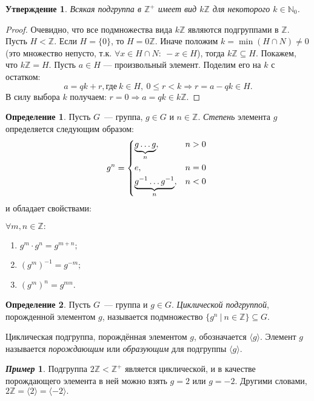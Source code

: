 \documentclass[a4paper, 14pt]{extarticle}
\newcommand{\n}{\par}
\newcommand{\integers}{\mathbb{Z}}
\newcommand{\naturals}{\mathbb{N}}
\theoremstyle{definition}
\newtheorem*{exmpl*}{\textit{Пример}}
\newtheorem{definition}{Определение}
\theoremstyle{plain}
\numberwithin{theorem}{section}
\numberwithin{definition}{section}
\newtheorem{statement}{Утверждение}
\numberwithin{statement}{section}
\numberwithin{lemma}{section}
\numberwithin{consequence}{section}
\begin{document}
	\begin{statement}
		Всякая подгруппа в $\integers ^ +$ имеет вид $k\integers$ для некоторого ${k \in \naturals_0}$.
	\end{statement}
	\begin{proof}
		Очевидно, что все подмножества вида $k\mathbb{Z}$ являются подгруппами в $\integers$.
		Пусть ${H < \integers}$. Если ${H = \{0\}}$, то ${H = 0\integers}$.
		Иначе положим ${k = \min(H \cap N) \neq 0}$ (это множество непусто, т.к. ${\forall x \in H \cap N{:} ~-x \in H}$), тогда ${k\integers \subseteq H}$.
		Покажем, что ${k\integers = H}$. Пусть ${a \in H}$ — произвольный элемент. Поделим его на $k$ с остатком:
		\begin{equation*}
			a = qk + r, \text{где} \ k \in H, \  
			0 \leqslant r < k \Rightarrow r = a - qk \in H.
		\end{equation*}
		В силу выбора $k$ получаем: ${r = 0 \Rightarrow a = qk \in k\integers}$.
	\end{proof}
	\begin{definition}
		Пусть $G$~--- группа, $g \in G$ и $n \in \integers$. \textit{Степень} элемента $g$ определяется следующим образом:
		\begin{equation*}
			g^{n}=
			\begin{cases*}
				\underbrace{g \ldots g}_n,  &$n > 0$ \\
				e,  &$n = 0$ \\
				\underbrace{g^{-1} \ldots g^{-1}}_n, &$n < 0$
			\end{cases*}
		\end{equation*}
		и обладает свойствами:\n
		$\forall m, n \in \integers:$
		\begin{enumerate}
			\setlength\itemsep{0.1em}
			\item $g^m \cdot g^n = g^{m+n};$
			\item $(g^m)^{-1} = g^{-m};$
			\item $(g^m)^n = g^{mn}.$
		\end{enumerate}
	\end{definition}
	\begin{definition}
		Пусть $G$~--- группа и $g \in G$. \textit{Циклической подгруппой}, порожденной элементом $g$, называется подмножество ${\{g^n \ | \ n \in \integers\} \subseteq G}$. \n
		Циклическая подгруппа, порождённая элементом $g$, обозначается $\langle g \rangle$. Элемент $g$ называется \textit{порождающим} или \textit{образующим} для подгруппы $\langle g \rangle$.
	\end{definition}
	\begin{exmpl*}
		Подгруппа ${2\integers < \integers ^ +}$ является циклической, и в качестве порождающего элемента в ней можно взять $g = 2$ или $g = -2.$ Другими словами, ${2\integers = \langle 2 \rangle = \langle -2 \rangle.}$
	\end{exmpl*}
\end{document}

